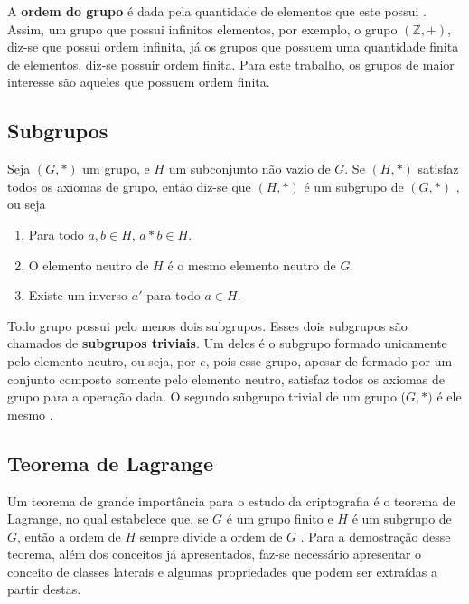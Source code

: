 A \textbf{ordem do grupo} é dada pela quantidade de elementos que este possui \cite{Coutinho:2014}. Assim, um grupo que possui infinitos elementos, por exemplo, o grupo $(\mathds{Z}, +)$, diz-se que possui ordem infinita, já os grupos que possuem uma quantidade finita de elementos, diz-se possuir ordem finita. Para este trabalho, os grupos de maior interesse são aqueles que possuem ordem finita.

%
%
\subsection{Subgrupos}
Seja $(G, *)$ um grupo, e \(H\) um subconjunto não vazio de \(G\). Se $(H, *)$ satisfaz todos os axiomas de grupo, então diz-se que $(H, *)$ é um subgrupo de $(G, *)$ \cite{Coutinho:2014}, ou seja

\begin{enumerate}
\item Para todo $a, b \in H$, $a * b \in H$.
\item O elemento neutro de \(H\) é o mesmo elemento neutro de \(G\).
\item Existe um inverso \(a'\) para todo $a \in H$.
\end{enumerate}

Todo grupo possui pelo menos dois subgrupos. Esses dois subgrupos são chamados de \textbf{subgrupos triviais}. Um deles é o subgrupo formado unicamente pelo elemento neutro, ou seja, por \(e\), pois esse grupo, apesar de formado por um conjunto composto somente pelo elemento neutro, satisfaz todos os axiomas de grupo para a operação dada. O segundo subgrupo trivial de um grupo (\(G, *)\) é ele mesmo \cite{Domingues:2003}.

%
%
\subsection{Teorema de Lagrange}
Um teorema de grande importância para o estudo da criptografia é o teorema de Lagrange, no qual estabelece que, se \(G\) é um grupo finito e \(H\) é um subgrupo de \(G\), então a ordem de \(H\) sempre divide a ordem de \(G\) \cite{Shoup:2005}. Para a demostração desse teorema, além dos conceitos já apresentados, faz-se necessário apresentar o conceito de classes laterais e algumas propriedades que podem ser extraídas a partir destas.

%
%
